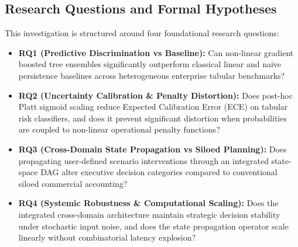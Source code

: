 \documentclass[journal]{IEEEtran}
\begin{document}
\subsection{Research Questions and Formal Hypotheses}
This investigation is structured around four foundational research questions:
\begin{itemize}
    \item \textbf{RQ1 (Predictive Discrimination vs Baseline):} Can non-linear gradient boosted tree ensembles significantly outperform classical linear and naive persistence baselines across heterogeneous enterprise tabular benchmarks?
    \item \textbf{RQ2 (Uncertainty Calibration \& Penalty Distortion):} Does post-hoc Platt sigmoid scaling reduce Expected Calibration Error (ECE) on tabular risk classifiers, and does it prevent significant distortion when probabilities are coupled to non-linear operational penalty functions?
    \item \textbf{RQ3 (Cross-Domain State Propagation vs Siloed Planning):} Does propagating user-defined scenario interventions through an integrated state-space DAG alter executive decision categories compared to conventional siloed commercial accounting?
    \item \textbf{RQ4 (Systemic Robustness \& Computational Scaling):} Does the integrated cross-domain architecture maintain strategic decision stability under stochastic input noise, and does the state propagation operator scale linearly without combinatorial latency explosion?
\end{itemize}
\end{document}
